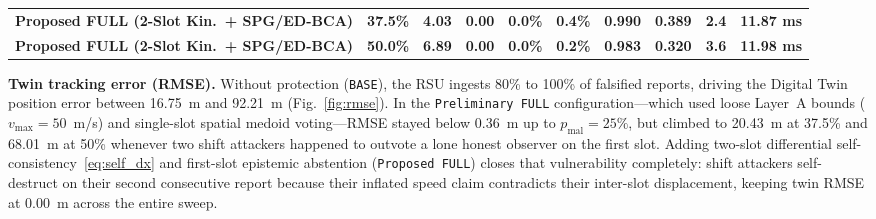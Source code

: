 \documentclass[conference]{IEEEtran}
\begin{document}
\begin{table}[t]
\begin{center}
\begin{tabular}{llrrrrrrrr}
\textbf{Proposed FULL (2-Slot Kin.\ + SPG/ED-BCA)} & \textbf{37.5\%} & \textbf{4.03} & \textbf{0.00} & \textbf{0.0\%} & \textbf{0.4\%} & \textbf{0.990} & \textbf{0.389} & \textbf{2.4} & \textbf{11.87 ms}\\
\textbf{Proposed FULL (2-Slot Kin.\ + SPG/ED-BCA)} & \textbf{50.0\%} & \textbf{6.89} & \textbf{0.00} & \textbf{0.0\%} & \textbf{0.2\%} & \textbf{0.983} & \textbf{0.320} & \textbf{3.6} & \textbf{11.98 ms}\\
\bottomrule
\end{tabular}
\label{tab:results}
\end{center}
\end{table}

\textbf{Twin tracking error (RMSE).} Without protection (\texttt{BASE}), the RSU ingests 80\% to 100\% of falsified reports, driving the Digital Twin position error between 16.75~m and 92.21~m (Fig.~\ref{fig:rmse}). In the \texttt{Preliminary FULL} configuration---which used loose Layer~A bounds ($v_{\max}=50$~m/s) and single-slot spatial medoid voting---RMSE stayed below 0.36~m up to $p_{\mathrm{mal}}=25\%$, but climbed to 20.43~m at 37.5\% and 68.01~m at 50\% whenever two shift attackers happened to outvote a lone honest observer on the first slot. Adding two-slot differential self-consistency~\eqref{eq:self_dx} and first-slot epistemic abstention (\texttt{Proposed FULL}) closes that vulnerability completely: shift attackers self-destruct on their second consecutive report because their inflated speed claim contradicts their inter-slot displacement, keeping twin RMSE at 0.00~m across the entire sweep.
\end{document}
